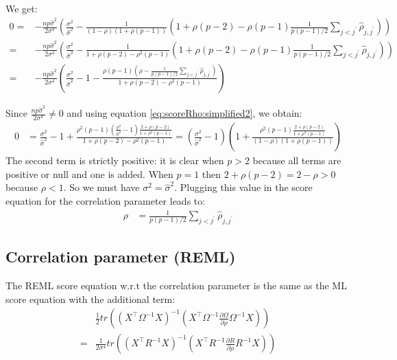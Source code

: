\documentclass[12pt]{article}
\newcommand\trans[1]{{#1}^\intercal}%
\begin{document}
We get:
\begin{align*}
0 =&-\frac{np \widehat{\sigma}^2}{2 \sigma^4}\left(\frac{\sigma^2}{\widehat{\sigma}^2} -\frac{1}{(1- \rho)(1+\rho(p-1))}\left(1 + \rho (p-2) - \rho(p-1)\frac{1}{p(p-1)/2}\sum_{j < j^{\prime}}\widehat{\rho}_{j,j^{\prime}}\right)\right)   \\
  =&-\frac{np \widehat{\sigma}^2}{2 \sigma^4}\left(\frac{\sigma^2}{\widehat{\sigma}^2} -\frac{1}{1 + \rho(p-2)  - \rho^2(p-1)}\left(1 + \rho (p-2) - \rho(p-1)\frac{1}{p(p-1)/2}\sum_{j < j^{\prime}}\widehat{\rho}_{j,j^{\prime}}\right)\right) \\
  =&-\frac{np \widehat{\sigma}^2}{2 \sigma^4}\left(\frac{\sigma^2}{\widehat{\sigma}^2} - 1  - \frac{\rho(p-1)\left(\rho-\frac{1}{p(p-1)/2}\sum_{j < j^{\prime}}\widehat{\rho}_{j,j^{\prime}}\right)}{1 + \rho(p-2)  - \rho^2(p-1)}\right) 
\end{align*}

Since \(\frac{np \widehat{\sigma}^2}{2 \sigma^4}\neq 0\) and using equation \autoref{eq:scoreRho:simplified2}, we obtain:
\begin{align*}
0 &= \frac{\sigma^2}{\widehat{\sigma}^2} - 1 + \frac{\rho^2(p-1)\left(\frac{\sigma^2}{\widehat{\sigma}^2}-1\right)\frac{2+\rho (p-2)}{1 + \rho^2(p-1)}}{1 + \rho(p-2)  - \rho^2(p-1)} 
= \left(\frac{\sigma^2}{\widehat{\sigma}^2} - 1\right) \left(1 + \frac{\rho^2(p-1)\frac{2+\rho (p-2)}{1 + \rho^2(p-1)}}{(1- \rho)(1+\rho(p-1))}\right) 
\end{align*}
The second term is strictly positive: it is clear when \(p>2\) because
all terms are positive or null and one is added. When \(p=1\) then \(2+\rho
(p-2)=2-\rho>0\) because \(\rho<1\). So we must have \(\sigma^2 =
\widehat{\sigma}^2\). Plugging this value in the score equation for
the correlation parameter leads to:
\begin{align*}
\rho &= \frac{1}{p(p-1)/2}\sum_{j < j^{\prime}}\widehat{\rho}_{j,j^{\prime}} 
\end{align*}

\subsection{Correlation parameter (REML)}
\label{sec:org32a6450}

The REML score equation w.r.t the correlation parameter is the same as the ML score equation with the additional term:
\begin{align*}
&\frac{1}{2} tr\left(\left(\trans{X}\Omega^{-1}X\right)^{-1} \left(\trans{X}\Omega^{-1}\frac{\partial \Omega}{\partial\rho}\Omega^{-1}X \right) \right) \\
=&\frac{1}{2 \sigma^4} tr\left(\left(\trans{X}R^{-1}X\right)^{-1} \left(\trans{X}R^{-1}\frac{\partial R}{\partial\rho}R^{-1}X \right) \right) 
\end{align*}
\end{document}
